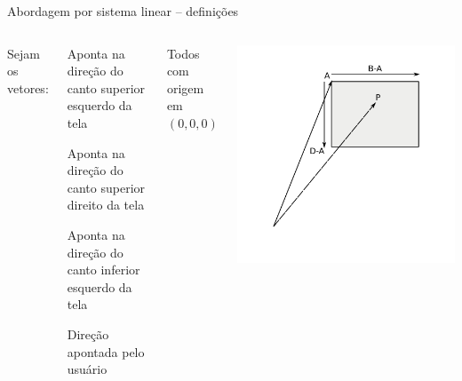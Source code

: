 \documentclass{beamer}
\begin{document}
\begin{frame}{Abordagem por sistema linear -- definições}
	\begin{columns}
		\pause
		Sejam os vetores:
		\begin{description}[A]
		\item[A] Aponta na direção do canto superior esquerdo da tela
		\item[B] Aponta na direção do canto superior direito da tela
		\item[D] Aponta na direção do canto inferior esquerdo da tela
		\item[P] Direção apontada pelo usuário
		\end{description}
		Todos com origem em $(0,0,0)$

		\includegraphics[keepaspectratio, width=1.0\textwidth, height=0.8\textheight, clip, trim=0.75in 0.75in 0.70in 0.50in]{../monografia/img/lineq.pdf}
	\end{columns}
\end{frame}
\end{document}
